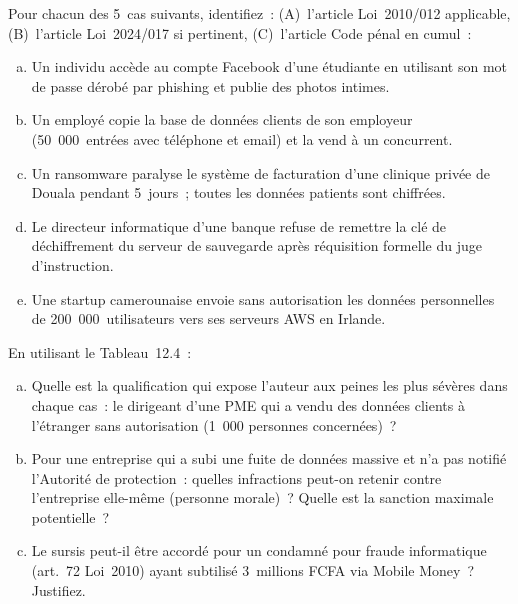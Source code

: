 \begin{boxexo}[title={\ding{45}\quad Exercice~12.1 --- Qualification nationale \niveaubase}]
Pour chacun des 5~cas suivants, identifiez~: (A)~l'article Loi~2010/012
applicable, (B)~l'article Loi~2024/017 si pertinent, (C)~l'article Code
pénal en cumul~:
\begin{enumerate}[(a)]
    \item Un individu accède au compte Facebook d'une étudiante en
          utilisant son mot de passe dérobé par phishing et publie des
          photos intimes.
    \item Un employé copie la base de données clients de son employeur
          (50~000~entrées avec téléphone et email) et la vend à un concurrent.
    \item Un ransomware paralyse le système de facturation d'une clinique
          privée de Douala pendant 5~jours~; toutes les données patients
          sont chiffrées.
    \item Le directeur informatique d'une banque refuse de remettre la
          clé de déchiffrement du serveur de sauvegarde après réquisition
          formelle du juge d'instruction.
    \item Une startup camerounaise envoie sans autorisation les données
          personnelles de 200~000~utilisateurs vers ses serveurs AWS
          en Irlande.
\end{enumerate}
\end{boxexo}

\begin{boxexo}[title={\ding{45}\quad Exercice~12.2 --- Tableau de sanctions \niveaumoyen}]
En utilisant le Tableau~12.4~:
\begin{enumerate}[(a)]
    \item Quelle est la qualification qui expose l'auteur aux peines les
          plus sévères dans chaque cas~: le dirigeant d'une PME qui a
          vendu des données clients à l'étranger sans autorisation (1~000
          personnes concernées)~?
    \item Pour une entreprise qui a subi une fuite de données massive
          et n'a pas notifié l'Autorité de protection~: quelles infractions
          peut-on retenir contre l'entreprise elle-même (personne morale)~?
          Quelle est la sanction maximale potentielle~?
    \item Le sursis peut-il être accordé pour un condamné pour fraude
          informatique (art.~72 Loi~2010) ayant subtilisé 3~millions FCFA
          via Mobile Money~? Justifiez.
\end{enumerate}
\end{boxexo}

